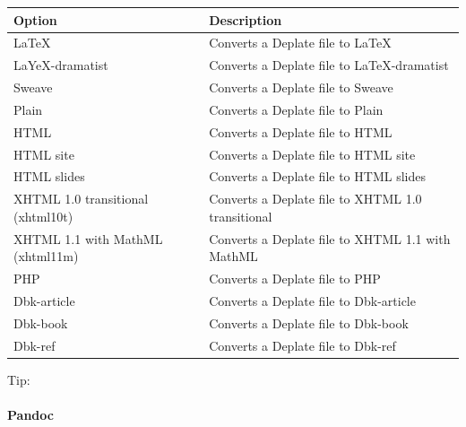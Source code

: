 \begin{scriptsize}\begin{tabularx}{\textwidth}{>{\hsize=0.6\hsize}X>{\hsize=0.7\hsize}X}\\
    \hline
    \textbf{Option} & \textbf{Description} \\
    \hline
    LaTeX & Converts a Deplate file to LaTeX \\
    LaYeX-dramatist & Converts a Deplate file to LaTeX-dramatist \\
    Sweave & Converts a Deplate file to Sweave \\
    Plain & Converts a Deplate file to Plain \\
    HTML & Converts a Deplate file to HTML \\
    HTML site & Converts a Deplate file to HTML site \\
    HTML slides & Converts a Deplate file to HTML slides \\
    XHTML 1.0 transitional (xhtml10t) & Converts a Deplate file to XHTML 1.0 transitional \\
    XHTML 1.1 with MathML (xhtml11m) & Converts a Deplate file to XHTML 1.1 with MathML \\
    PHP & Converts a Deplate file to PHP \\
    Dbk-article & Converts a Deplate file to Dbk-article \\
    Dbk-book & Converts a Deplate file to Dbk-book \\
    Dbk-ref & Converts a Deplate file to Dbk-ref \\
    \hline
  \end{tabularx}\end{scriptsize}

Tip: 


\newpage
\hypertarget{menu_tools_processing_conversion_pandoc}{}
\paragraph{}\textbf{Pandoc}\\

